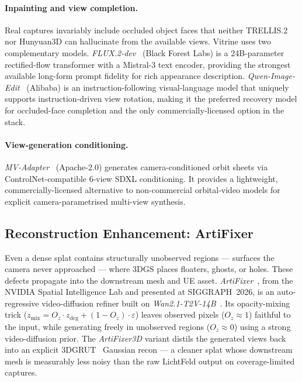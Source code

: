 \paragraph{Inpainting and view completion.}
Real captures invariably include occluded object faces that neither TRELLIS.2 nor
Hunyuan3D can hallucinate from the available views.  Vitrine uses two complementary
models.  \emph{FLUX.2-dev}~\cite{flux2025} (Black Forest Labs) is a 24B-parameter
rectified-flow transformer with a Mistral-3 text encoder, providing the strongest
available long-form prompt fidelity for rich appearance description.
\emph{Qwen-Image-Edit}~\cite{qwenvl2025} (Alibaba) is an instruction-following
visual-language model that uniquely supports instruction-driven view rotation, making
it the preferred recovery model for occluded-face completion and the only
commercially-licensed option in the stack.

\paragraph{View-generation conditioning.}
\emph{MV-Adapter}~\cite{mvadapter2024} (Apache-2.0) generates camera-conditioned
orbit sheets via ControlNet-compatible 6-view SDXL conditioning.  It provides a
lightweight, commercially-licensed alternative to non-commercial orbital-video
models for explicit camera-parametrised multi-view synthesis.

\subsection{Reconstruction Enhancement: ArtiFixer}
\label{sec:tech:artifixer}

Even a dense splat contains structurally unobserved regions --- surfaces the camera
never approached --- where 3DGS places floaters, ghosts, or holes.  These defects
propagate into the downstream mesh and UE asset.
\emph{ArtiFixer}~\cite{delutio2026_artifixer}, from the NVIDIA Spatial Intelligence
Lab and presented at SIGGRAPH~2026, is an auto-regressive video-diffusion refiner
built on \emph{Wan2.1-T2V-14B}~\cite{wan2025}.  Its opacity-mixing trick
($z_{\mathrm{mix}} = O_z \cdot z_{\mathrm{deg}} + (1-O_z) \cdot \varepsilon$)
leaves observed pixels ($O_z \approx 1$) faithful to the input, while generating
freely in unobserved regions ($O_z \approx 0$) using a strong video-diffusion prior.
The \emph{ArtiFixer3D} variant distils the generated views back into an explicit
3DGRUT~\cite{wu2025_3dgut} Gaussian recon --- a cleaner splat whose downstream mesh
is measurably less noisy than the raw LichtFeld output on coverage-limited captures.

